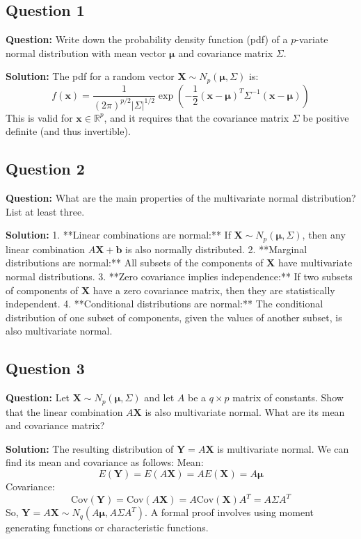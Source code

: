 \subsection*{Question 1}
\textbf{Question:} Write down the probability density function (pdf) of a $p$-variate normal distribution with mean vector $\boldsymbol{\mu}$ and covariance matrix $\Sigma$.

\textbf{Solution:}
The pdf for a random vector $\mathbf{X} \sim N_p(\boldsymbol{\mu}, \Sigma)$ is:
$$ f(\mathbf{x}) = \frac{1}{(2\pi)^{p/2} |\Sigma|^{1/2}} \exp\left(-\frac{1}{2} (\mathbf{x} - \boldsymbol{\mu})^T \Sigma^{-1} (\mathbf{x} - \boldsymbol{\mu})\right) $$
This is valid for $\mathbf{x} \in \mathbb{R}^p$, and it requires that the covariance matrix $\Sigma$ be positive definite (and thus invertible).

\subsection*{Question 2}
\textbf{Question:} What are the main properties of the multivariate normal distribution? List at least three.

\textbf{Solution:}
1.  **Linear combinations are normal:** If $\mathbf{X} \sim N_p(\boldsymbol{\mu}, \Sigma)$, then any linear combination $A\mathbf{X} + \mathbf{b}$ is also normally distributed.
2.  **Marginal distributions are normal:** All subsets of the components of $\mathbf{X}$ have multivariate normal distributions.
3.  **Zero covariance implies independence:** If two subsets of components of $\mathbf{X}$ have a zero covariance matrix, then they are statistically independent.
4.  **Conditional distributions are normal:** The conditional distribution of one subset of components, given the values of another subset, is also multivariate normal.

\subsection*{Question 3}
\textbf{Question:} Let $\mathbf{X} \sim N_p(\boldsymbol{\mu}, \Sigma)$ and let $A$ be a $q \times p$ matrix of constants. Show that the linear combination $A\mathbf{X}$ is also multivariate normal. What are its mean and covariance matrix?

\textbf{Solution:}
The resulting distribution of $\mathbf{Y} = A\mathbf{X}$ is multivariate normal. We can find its mean and covariance as follows:
Mean:
$$ E(\mathbf{Y}) = E(A\mathbf{X}) = A E(\mathbf{X}) = A\boldsymbol{\mu} $$
Covariance:
$$ \text{Cov}(\mathbf{Y}) = \text{Cov}(A\mathbf{X}) = A \text{Cov}(\mathbf{X}) A^T = A \Sigma A^T $$
So, $\mathbf{Y} = A\mathbf{X} \sim N_q(A\boldsymbol{\mu}, A\Sigma A^T)$. A formal proof involves using moment generating functions or characteristic functions.

